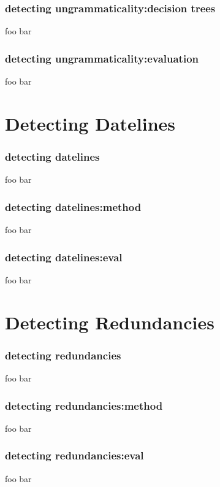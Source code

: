 \documentclass{beamer}
\begin{document}
\begin{frame}
  \frametitle{detecting ungrammaticality:decision trees}
  foo bar
\end{frame}

\begin{frame}
  \frametitle{detecting ungrammaticality:evaluation}
  foo bar
\end{frame}

\section{Detecting Datelines}
\begin{frame}
  \frametitle{detecting datelines}
  foo bar
\end{frame}

\begin{frame}
  \frametitle{detecting datelines:method}
  foo bar
\end{frame}

\begin{frame}
  \frametitle{detecting datelines:eval}
  foo bar
\end{frame}

\section{Detecting Redundancies}
\begin{frame}
  \frametitle{detecting redundancies}
  foo bar
\end{frame}

\begin{frame}
  \frametitle{detecting redundancies:method}
  foo bar
\end{frame}

\begin{frame}
  \frametitle{detecting redundancies:eval}
  foo bar
\end{frame}
\end{document}
